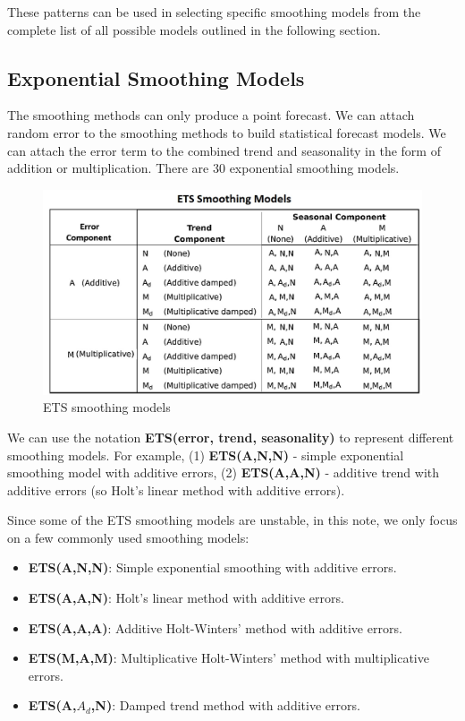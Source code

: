 \documentclass[
]{book}
\begin{document}
These patterns can be used in selecting specific smoothing models from the complete list of all possible models outlined in the following section.

\hypertarget{exponential-smoothing-models}{%
\subsection{Exponential Smoothing Models}\label{exponential-smoothing-models}}

The smoothing methods can only produce a point forecast. We can attach random error to the smoothing methods to build statistical forecast models. We can attach the error term to the combined trend and seasonality in the form of addition or multiplication. There are 30 exponential smoothing models.

\begin{figure}

{\centering \includegraphics[width=0.8\linewidth]{img13/w13-ETS-30-SmoothingModels} 

}

\caption{ETS smoothing models}\label{fig:unnamed-chunk-238}
\end{figure}

We can use the notation \textbf{ETS(error, trend, seasonality)} to represent different smoothing models. For example, (1) \textbf{ETS(A,N,N)} - simple exponential smoothing model with additive errors, (2) \textbf{ETS(A,A,N)} - additive trend with additive errors (so Holt's linear method with additive errors).

Since some of the ETS smoothing models are unstable, in this note, we only focus on a few commonly used smoothing models:

\begin{itemize}
\item
  \textbf{ETS(A,N,N)}: Simple exponential smoothing with additive errors.
\item
  \textbf{ETS(A,A,N)}: Holt's linear method with additive errors.
\item
  \textbf{ETS(A,A,A)}: Additive Holt-Winters' method with additive errors.
\item
  \textbf{ETS(M,A,M)}: Multiplicative Holt-Winters' method with multiplicative errors.
\item
  \textbf{ETS(A,\(A_d\),N)}: Damped trend method with additive errors.
\end{itemize}
\end{document}
